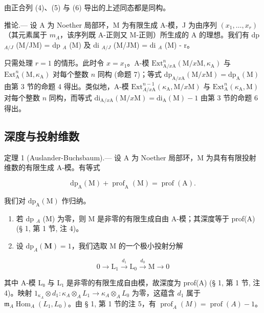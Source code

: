 由正合列 (4)、(5) 与 (6) 导出的上述同态都是同构。

推论.--- 设 A 为 Noether 局部环，M 为有限生成 A-模，J 为由序列 \((x_{1},\ldots,x_{r})\)（其元素属于 \(m_{A}\)，该序列既 A-正则又 M-正则）所生成的 A 的理想。我们有 dp \(_{A/J}\) (M/JM) = dp \(_{A}\) (M) 及 di \(_{A/J}\) (M/JM) = di \(_{A}\) (M) - r。

只需处理 \(r = 1\) 的情形。此时令 \(x = x_1\)。A-模 \(\mathrm{Ext}_{\mathrm{A} / x\mathrm{A}}^{n}(\mathrm{M} / x\mathrm{M},\kappa_{\mathrm{A}})\) 与 \(\mathrm{Ext}_{\mathrm{A}}^{n}(\mathrm{M},\kappa_{\mathrm{A}})\) 对每个整数 \(n\) 同构 (命题 7)；等式 \(\mathrm{dp}_{\mathrm{A} / x\mathrm{A}}(\mathrm{M} / x\mathrm{M}) = \mathrm{dp}_{\mathrm{A}}(\mathrm{M})\) 由第 3 节的命题 4 得出。类似地，A-模 \(\mathrm{Ext}_{A /x\mathrm{A}}^{n - 1}(\kappa_{\mathrm{A}},\mathrm{M} / x\mathrm{M})\) 与 \(\mathrm{Ext}_{\mathrm{A}}^{n}(\kappa_{\mathrm{A}},\mathrm{M})\) 对每个整数 \(n\) 同构，而等式 \(\mathrm{di}_{\mathrm{A} / x\mathrm{A}}(\mathrm{M} / x\mathrm{M}) = \mathrm{di}_{\mathrm{A}}(\mathrm{M}) - 1\) 由第 3 节的命题 6 得出。

\subsection{深度与投射维数}

定理 1 (Auslander-Buchsbaum).--- 设 A 为 Noether 局部环，M 为具有有限投射维数的有限生成 A-模。有等式

\[
\mathrm{dp} _ {\mathrm{A}} (\mathrm{M}) + \operatorname{prof} _ {\mathrm{A}} (\mathrm{M}) = \operatorname{prof} (\mathrm{A}).
\]

我们对 \(\mathrm{dp}_{\mathrm{A}}(\mathrm{M})\) 作归纳。

\begin{enumerate}
\def\labelenumi{\alph{enumi})}
\item
  若 dp \(_{A}\) (M) 为零，则 M 是非零的有限生成自由 A-模；其深度等于 prof(A) (§ 1, 第 1 节, 注 4)。
\item
  设 \(\mathrm{dp}_{A}(\mathbf{M}) = 1\)，我们选取 M 的一个极小投射分解
\end{enumerate}

\[
0 \to \mathrm{L} _ {1} \xrightarrow {d _ {1}} \mathrm{L} _ {0} \xrightarrow {d _ {0}} \mathrm{M} \to 0
\]

其中 A-模 L₀ 与 L₁ 是非零的有限生成自由模，故深度为 prof(A) (§ 1, 第 1 节, 注 4)。映射 \(1_{\kappa_{A}} \otimes d_{1} : \kappa_{A} \otimes_{A} L_{1} \longrightarrow \kappa_{A} \otimes_{A} L_{0}\) 为零，这蕴含 \(d_{1}\) 属于 \(\mathfrak{m}_{A} \operatorname{Hom}_{A}(L_{1}, L_{0})\)。由 § 1, 第 1 节的注 5，有 \(\operatorname{prof}_{A}(M) = \operatorname{prof}(A) - 1\)。

